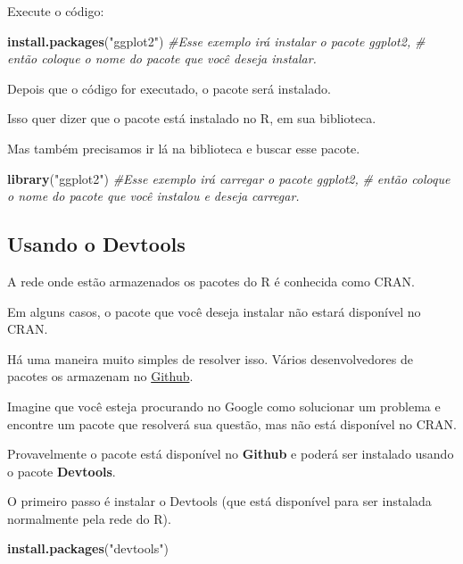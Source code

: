 \documentclass[
]{book}
\newenvironment{Shaded}{\begin{snugshade}}{\end{snugshade}}
\newcommand{\CommentTok}[1]{\textcolor[rgb]{0.56,0.35,0.01}{\textit{#1}}}
\newcommand{\KeywordTok}[1]{\textcolor[rgb]{0.13,0.29,0.53}{\textbf{#1}}}
\newcommand{\NormalTok}[1]{#1}
\newcommand{\StringTok}[1]{\textcolor[rgb]{0.31,0.60,0.02}{#1}}
\begin{document}
Execute o código:

\begin{Shaded}
\begin{Highlighting}[]
\KeywordTok{install.packages}\NormalTok{(}\StringTok{"ggplot2"}\NormalTok{) }\CommentTok{#Esse exemplo irá instalar o pacote ggplot2, }
\CommentTok{# então coloque o nome do pacote que você deseja instalar.}
\end{Highlighting}
\end{Shaded}

Depois que o código for executado, o pacote será instalado.

Isso quer dizer que o pacote está instalado no R, em sua biblioteca.

Mas também precisamos ir lá na biblioteca e buscar esse pacote.

\begin{Shaded}
\begin{Highlighting}[]
\KeywordTok{library}\NormalTok{(}\StringTok{"ggplot2"}\NormalTok{) }\CommentTok{#Esse exemplo irá carregar o pacote ggplot2,}
\CommentTok{# então coloque o nome do pacote que você instalou e deseja carregar.}
\end{Highlighting}
\end{Shaded}

\hypertarget{usando-o-devtools}{%
\subsection{Usando o Devtools}\label{usando-o-devtools}}

A rede onde estão armazenados os pacotes do R é conhecida como CRAN.

Em alguns casos, o pacote que você deseja instalar não estará disponível
no CRAN.

Há uma maneira muito simples de resolver isso. Vários desenvolvedores de
pacotes os armazenam no \href{https://www.github.com}{Github}.

Imagine que você esteja procurando no Google como solucionar um problema
e encontre um pacote que resolverá sua questão, mas não está disponível
no CRAN.

Provavelmente o pacote está disponível no \textbf{Github} e poderá ser
instalado usando o pacote \textbf{Devtools}.

O primeiro passo é instalar o Devtools (que está disponível para ser
instalada normalmente pela rede do R).

\begin{Shaded}
\begin{Highlighting}[]
\KeywordTok{install.packages}\NormalTok{(}\StringTok{"devtools"}\NormalTok{)}
\end{Highlighting}
\end{Shaded}
\end{document}
